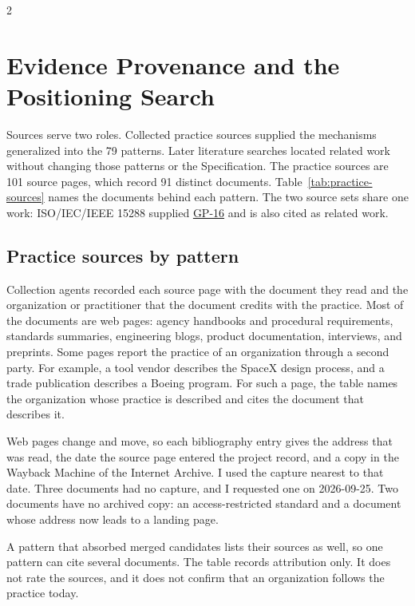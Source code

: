 \begin{multicols}{2}
\section{Evidence Provenance and the Positioning Search}
\label{app:sources}
\setcounter{table}{0}
\setcounter{figure}{0}

Sources serve two roles. Collected practice sources supplied the mechanisms generalized into the 79 patterns. Later literature searches located related work without changing those patterns or the Specification. The practice sources are 101 source pages, which record 91 distinct documents. Table~\ref{tab:practice-sources} names the documents behind each pattern. The two source sets share one work: ISO/IEC/IEEE 15288 supplied \hyperlink{gp-16}{GP-16} and is also cited as related work.

\subsection{Practice sources by pattern}

Collection agents recorded each source page with the document they read and the organization or practitioner that the document credits with the practice. Most of the documents are web pages: agency handbooks and procedural requirements, standards summaries, engineering blogs, product documentation, interviews, and preprints. Some pages report the practice of an organization through a second party. For example, a tool vendor describes the SpaceX design process, and a trade publication describes a Boeing program. For such a page, the table names the organization whose practice is described and cites the document that describes it.

Web pages change and move, so each bibliography entry gives the address that was read, the date the source page entered the project record, and a copy in the Wayback Machine of the Internet Archive. I used the capture nearest to that date. Three documents had no capture, and I requested one on 2026-09-25. Two documents have no archived copy: an access-restricted standard and a document whose address now leads to a landing page.

A pattern that absorbed merged candidates lists their sources as well, so one pattern can cite several documents. The table records attribution only. It does not rate the sources, and it does not confirm that an organization follows the practice today.
\end{multicols}

